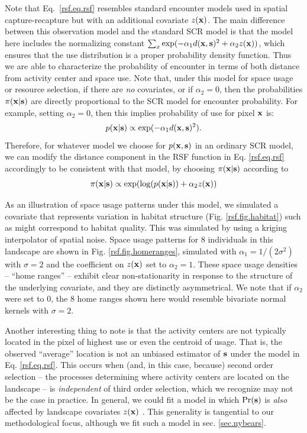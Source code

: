 \documentclass[12pt]{article}
\begin{document}
Note that Eq.~\ref{rsf.eq.rsf} resembles standard encounter models
used in spatial capture-recapture but with an additional covariate
$z({\bf x})$.  The main difference between this observation model and
the standard SCR model is that the model here includes the normalizing
constant $\sum_{x} \exp(-\alpha_{1} d({\bf x},{\bf s})^{2} +\alpha_{2}
z({\bf x}))$, which ensures that the use distribution is a proper
probability density function. Thus we are able to characterize the
probability of encounter in terms of both distance from activity
center and space use.
Note that, under this model for space usage or resource selection, if
there are {\it no} covariates, or if $\alpha_{2} = 0$, then the
probabilities $\pi({\bf x}|{\bf s})$ are directly proportional to the
SCR model for encounter probability.  For example, setting $\alpha_{2}
= 0$, then this implies probability of use for pixel ${\bf x}$ is:
\[
p({\bf x}|{\bf s}) \propto  \exp( -\alpha_{1} d({\bf x},{\bf s})^{2}).
\]
Therefore,
for whatever model we choose for
$p({\bf x},{\bf s})$ in an ordinary SCR model, we can modify the distance
component in the RSF function in Eq. \ref{rsf.eq.rsf} accordingly to
be consistent with that model, by choosing $\pi({\bf x}|{\bf s})$
according to
\[
\pi({\bf x}|{\bf s}) \propto \exp( \log(p({\bf x}|{\bf s})) + \alpha_{2} z({\bf x}))
\]


As an illustration of space usage patterns under this model, we
simulated a covariate that represents variation in habitat structure
(Fig. \ref{rsf.fig.habitat}) such as might correspond to habitat
quality.
This was simulated by using a
 kriging interpolator  of spatial noise.
Space usage patterns for
 8 individuals in this landscape are shown in Fig. \ref{rsf.fig.homeranges},
simulated with $\alpha_{1} = 1/(2\sigma^2)$ with $\sigma = 2$ and the
coefficient on $z({\bf x})$ set to $\alpha_{2} = 1$.
These space usage densities -- ``home ranges'' -- exhibit clear
non-stationarity in response to the structure of the underlying
covariate, and they are distinctly asymmetrical.  We note that if
$\alpha_{2}$ were set to 0, the 8 home ranges shown here would
resemble bivariate normal kernels with $\sigma = 2$.

Another
interesting thing to note is that the activity centers are not
typically located in the pixel of highest use or even the centroid of
usage. That is, the observed ``average'' location is not an unbiased
estimator of ${\bf s}$ under the model in Eq. \ref{rsf.eq.rsf}.
This occurs when (and, in this case, because) second order selection
-- the processes determining where activity centers are located on the
landscape -- is {\it independent} of third order selection, which we recognize may
not be the case in practice. In general, we could fit a model in which
$\Pr({\bf s})$ is {\it also} affected by
landscape covariates $z({\bf x})$ \citep{borchers_efford:2008}. This
generality is tangential to our methodological focus, although we fit
such a model in sec. \ref{sec.nybears}.
\end{document}
